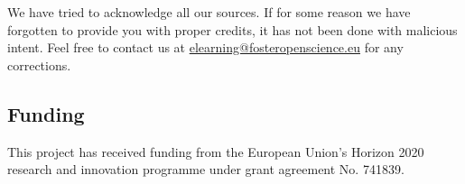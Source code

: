 \documentclass{article}
\begin{document}
We have tried to acknowledge all our sources. If for some reason we have forgotten to provide you with proper credits, it has not been done with malicious intent. Feel free to contact us at \href{mailto:elearning@fosteropenscience.eu}{elearning@fosteropenscience.eu} for any corrections.


\subsection{Funding}\label{funding}



This project has received funding from the European Union’s Horizon 2020 research and innovation programme under grant agreement No. 741839.
\end{document}

